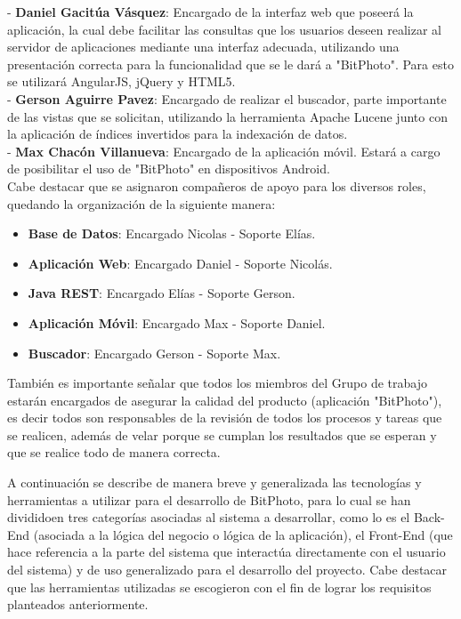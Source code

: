 \documentclass{memoria}
\begin{document}
- \textbf{Daniel Gacitúa Vásquez}: Encargado de la interfaz web que poseerá la aplicación, la cual debe  facilitar las consultas que los usuarios deseen realizar al servidor de aplicaciones mediante una interfaz adecuada, utilizando una presentación correcta para la funcionalidad que se le dará a "BitPhoto". Para esto se utilizará AngularJS, jQuery y HTML5.\\

- \textbf{Gerson Aguirre Pavez}: Encargado de realizar el buscador, parte importante de las vistas que se solicitan, utilizando la herramienta Apache Lucene junto con la aplicación de índices invertidos para la indexación de datos.\\

- \textbf{Max Chacón Villanueva}: Encargado de la aplicación móvil. Estará a cargo de posibilitar el uso de "BitPhoto" en dispositivos Android.\\


Cabe destacar que se asignaron compañeros de apoyo para los diversos roles, quedando la organización de la siguiente manera:

\begin{itemize}
	\item \textbf{Base de Datos}: Encargado Nicolas - Soporte Elías.
	\item \textbf{Aplicación Web}: Encargado Daniel - Soporte Nicolás.
	\item \textbf{Java REST}: Encargado Elías - Soporte Gerson.
	\item \textbf{Aplicación Móvil}: Encargado Max - Soporte Daniel.
	\item \textbf{Buscador}: Encargado Gerson - Soporte Max.
\end{itemize}

También es importante señalar que todos los miembros del Grupo de trabajo estarán encargados de asegurar la calidad del producto (aplicación "BitPhoto"), es decir todos son responsables de la revisión de todos los procesos y tareas que se realicen, además de velar porque se cumplan los resultados que se esperan y que se realice todo de manera correcta.

\newpage


A continuación se describe de manera breve y generalizada las tecnologías y herramientas a utilizar para el desarrollo de BitPhoto, para lo cual se han divididoen tres categorías asociadas al sistema a desarrollar, como lo es el Back-End (asociada a la lógica del negocio o lógica de la aplicación), el Front-End (que hace referencia a la parte del sistema que interactúa directamente con el usuario del sistema) y de uso generalizado para el desarrollo del proyecto.  Cabe destacar que las herramientas utilizadas se escogieron con el fin de lograr los requisitos planteados anteriormente.\\
\end{document}
